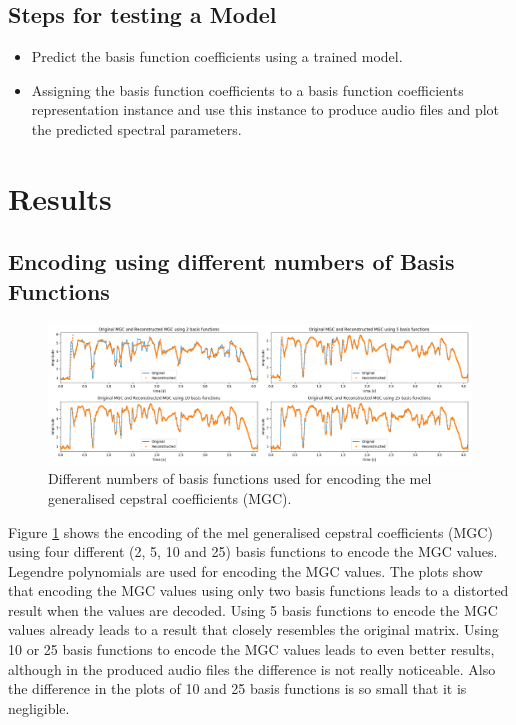 \documentclass{article}
\begin{document}
\subsection{Steps for testing a Model}
\begin{itemize}
	\item Predict the basis function coefficients using a trained model.
	\item Assigning the basis function coefficients to a basis function 
	coefficients representation instance and use this instance to produce audio 
	files and plot the predicted spectral parameters.
\end{itemize}

\section{Results}
\subsection{Encoding using different numbers of Basis Functions}
\begin{figure}
	\centering
	\includegraphics[width=\linewidth]{different_basis_functions}
	\caption{Different numbers of basis functions used for encoding the mel 
	generalised cepstral coefficients (MGC).}
	\label{different_basis_functions}
\end{figure}

Figure \ref{different_basis_functions} shows the encoding of the mel 
generalised cepstral coefficients (MGC) using four different (2, 5, 10 and 
25) basis functions to encode the MGC values. Legendre polynomials are used for 
encoding the MGC values. The plots show that encoding the MGC values using only 
two basis functions leads to a distorted result when the values are decoded. 
Using 5 basis functions to encode the MGC values already leads to a result that 
closely resembles the original matrix. Using 10 or 25 basis functions to encode 
the MGC values leads to even better results, although in the produced audio 
files the difference is not really noticeable. Also the difference in the plots 
of 10 and 25 basis functions is so small that it is negligible.
\end{document}
